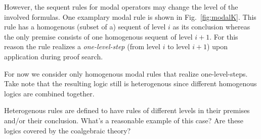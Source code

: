 \documentclass{entcs}
\begin{document}
However, the sequent rules for modal operators may change the level of the
involved formulas. One examplary modal rule is shown in Fig.~\ref{fig:modalK}.
This rule has a homogenous (subset of a) sequent of level $i$ as its
conclusion whereas the only premise consists of one homogenous sequent of level
$i+1$. For this reason the rule realizes a \emph{one-level-step}
(from level $i$ to level $i+1$) upon application during proof search.

For now we consider only homogenous modal rules that realize one-level-steps. Take note that
the resulting logic still is heterogenous since different homogenous logics are combined
together.

\begin{remark}
Heterogenous rules are defined to have rules of different levels in their premises and/or
their conclusion. What's a reasonable example of this case? Are these logics covered by
the coalgebraic theory?
\end{remark}
\end{document}
